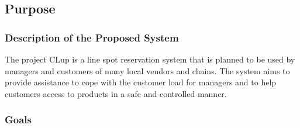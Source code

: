 \subsection{Purpose}

\subsubsection{Description of the Proposed System}
The project CLup is a line spot reservation system that is planned to be used by managers and customers of many local vendors and chains.
The system aims to provide assistance to cope with the customer load for managers and to help customers access to products in a safe and controlled manner.

\subsubsection{Goals}



